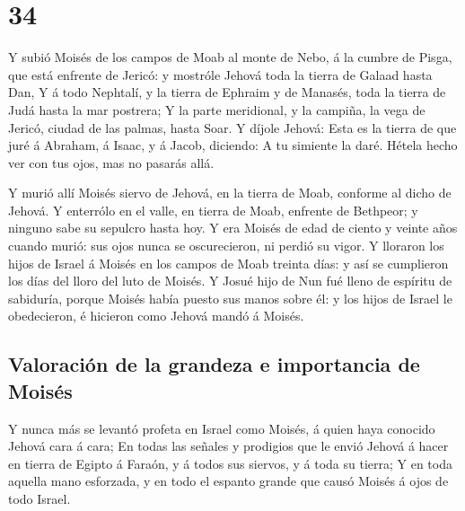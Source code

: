 \hypertarget{section-33}{%
\section{34}\label{section-33}}

 Y subió Moisés de los campos de Moab al monte de Nebo, á
la cumbre de Pisga, que está enfrente de Jericó: y mostróle Jehová toda
la tierra de Galaad hasta Dan,  Y á todo Nephtalí, y la
tierra de Ephraim y de Manasés, toda la tierra de Judá hasta la mar
postrera;  Y la parte meridional, y la campiña, la vega de
Jericó, ciudad de las palmas, hasta Soar.  Y díjole
Jehová: Esta es la tierra de que juré á Abraham, á Isaac, y á Jacob,
diciendo: A tu simiente la daré. Hétela hecho ver con tus ojos, mas no
pasarás allá.

 Y murió allí Moisés siervo de Jehová, en la tierra de
Moab, conforme al dicho de Jehová.  Y enterrólo en el
valle, en tierra de Moab, enfrente de Bethpeor; y ninguno sabe su
sepulcro hasta hoy.  Y era Moisés de edad de ciento y
veinte años cuando murió: sus ojos nunca se oscurecieron, ni perdió su
vigor.  Y lloraron los hijos de Israel á Moisés en los
campos de Moab treinta días: y así se cumplieron los días del lloro del
luto de Moisés.  Y Josué hijo de Nun fué lleno de espíritu
de sabiduría, porque Moisés había puesto sus manos sobre él: y los hijos
de Israel le obedecieron, é hicieron como Jehová mandó á Moisés.

\hypertarget{valoraciuxf3n-de-la-grandeza-e-importancia-de-moisuxe9s}{%
\subsection{Valoración de la grandeza e importancia de
Moisés}\label{valoraciuxf3n-de-la-grandeza-e-importancia-de-moisuxe9s}}

 Y nunca más se levantó profeta en Israel como Moisés, á
quien haya conocido Jehová cara á cara;  En todas las
señales y prodigios que le envió Jehová á hacer en tierra de Egipto á
Faraón, y á todos sus siervos, y á toda su tierra;  Y en
toda aquella mano esforzada, y en todo el espanto grande que causó
Moisés á ojos de todo Israel.
